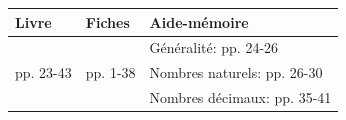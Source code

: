 

\def\arraystretch{1.2}
\begin{tabularx}{\linewidth}{|>{\centering\arraybackslash}p{3cm}|>{\centering\arraybackslash}p{3cm}|X|}
\hline
\cellcolor{themeNO!30} Livre & \cellcolor{themeNO!30} Fiches & \cellcolor{themeNO!30} \hfill Aide-mémoire\hfill\null\\
\hline
&&Généralité: pp. 24-26\\
pp. 23-43&pp. 1-38&Nombres naturels: pp. 26-30\\
&&Nombres décimaux: pp. 35-41\\
\hline
\end{tabularx}
\def\arraystretch{1}

